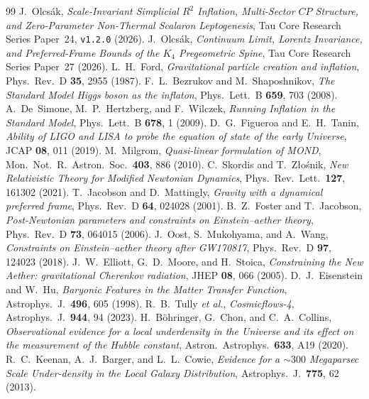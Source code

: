\documentclass[11pt,a4paper]{article}
\begin{document}
\begin{thebibliography}{99}
 J.~Olcs\'ak, \textit{Scale-Invariant Simplicial $R^2$ Inflation, Multi-Sector $CP$ Structure, and Zero-Parameter Non-Thermal Scalaron Leptogenesis}, Tau Core Research Series Paper~24, \texttt{v1.2.0} (2026).
 J.~Olcs\'ak, \textit{Continuum Limit, Lorentz Invariance, and Preferred-Frame Bounds of the $K_4$ Pregeometric Spine}, Tau Core Research Series Paper~27 (2026).
 L.~H.~Ford, \textit{Gravitational particle creation and inflation}, Phys.\ Rev.\ D \textbf{35}, 2955 (1987).
 F.~L.~Bezrukov and M.~Shaposhnikov, \textit{The Standard Model Higgs boson as the inflaton}, Phys.\ Lett.\ B \textbf{659}, 703 (2008).
 A.~De~Simone, M.~P.~Hertzberg, and F.~Wilczek, \textit{Running Inflation in the Standard Model}, Phys.\ Lett.\ B \textbf{678}, 1 (2009).
 D.~G.~Figueroa and E.~H.~Tanin, \textit{Ability of LIGO and LISA to probe the equation of state of the early Universe}, JCAP \textbf{08}, 011 (2019).
 M.~Milgrom, \textit{Quasi-linear formulation of MOND}, Mon.\ Not.\ R.\ Astron.\ Soc.\ \textbf{403}, 886 (2010).
 C.~Skordis and T.~Z\l{}o\'snik, \textit{New Relativistic Theory for Modified Newtonian Dynamics}, Phys.\ Rev.\ Lett.\ \textbf{127}, 161302 (2021).
 T.~Jacobson and D.~Mattingly, \textit{Gravity with a dynamical preferred frame}, Phys.\ Rev.\ D \textbf{64}, 024028 (2001).
 B.~Z.~Foster and T.~Jacobson, \textit{Post-Newtonian parameters and constraints on Einstein--aether theory}, Phys.\ Rev.\ D \textbf{73}, 064015 (2006).
 J.~Oost, S.~Mukohyama, and A.~Wang, \textit{Constraints on Einstein--aether theory after GW170817}, Phys.\ Rev.\ D \textbf{97}, 124023 (2018).
 J.~W.~Elliott, G.~D.~Moore, and H.~Stoica, \textit{Constraining the New Aether: gravitational Cherenkov radiation}, JHEP \textbf{08}, 066 (2005).
 D.~J.~Eisenstein and W.~Hu, \textit{Baryonic Features in the Matter Transfer Function}, Astrophys.\ J.\ \textbf{496}, 605 (1998).
 R.~B.~Tully \textit{et al.}, \textit{Cosmicflows-4}, Astrophys.\ J.\ \textbf{944}, 94 (2023).
 H.~B\"ohringer, G.~Chon, and C.~A.~Collins, \textit{Observational evidence for a local underdensity in the Universe and its effect on the measurement of the Hubble constant}, Astron.\ Astrophys.\ \textbf{633}, A19 (2020).
 R.~C.~Keenan, A.~J.~Barger, and L.~L.~Cowie, \textit{Evidence for a $\sim 300$ Megaparsec Scale Under-density in the Local Galaxy Distribution}, Astrophys.\ J.\ \textbf{775}, 62 (2013).

\end{thebibliography}
\end{document}
